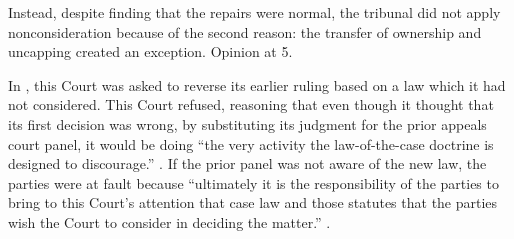 \documentclass[12pt,\documentclassflag]{michiganCourtOfAppealsBrief}
\begin{document}


Instead, despite finding that the repairs were normal, the tribunal did not apply nonconsideration because of the second reason: the transfer of ownership and uncapping created an exception. Opinion at 5. %

In \cite[s]{Bennett}, this Court was asked to reverse its earlier ruling based on a law which it had not considered. This Court refused, reasoning that even though it thought that its first decision was wrong, by substituting its judgment for the prior appeals court panel, it would be doing ``the very activity the law-of-the-case doctrine is designed to discourage.'' . If the prior panel was not aware of the new law, the parties were at fault because ``ultimately it is the responsibility of the parties to bring to this Court's attention that case law and those statutes that the parties wish the Court to consider in deciding the matter.'' .

\end{document}
